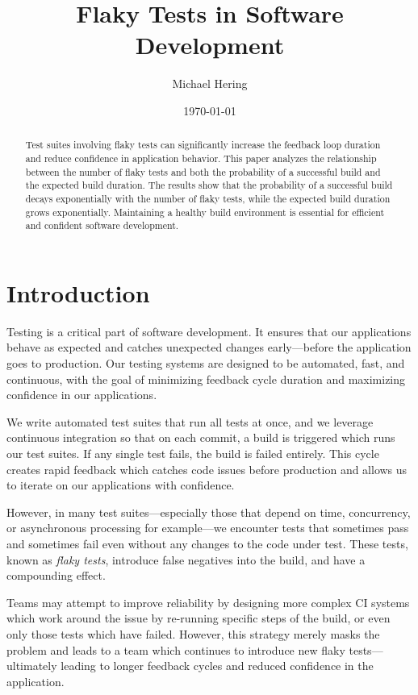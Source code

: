\documentclass[letterpaper]{article}
\title{Flaky Tests in Software Development}
\author{Michael Hering}
\date{\today}
\begin{document}
\maketitle

\begin{abstract}    
    Test suites involving flaky tests can significantly increase the feedback loop duration and reduce confidence in application behavior. This paper analyzes the relationship between the number of flaky tests and both the probability of a successful build and the expected build duration. The results show that the probability of a successful build decays exponentially with the number of flaky tests, while the expected build duration grows exponentially. Maintaining a healthy build environment is essential for efficient and confident software development.
\end{abstract}

\section{Introduction}

Testing is a critical part of software development. It ensures that our applications behave as expected and catches unexpected changes early—before the application goes to production. Our testing systems are designed to be automated, fast, and continuous, with the goal of minimizing feedback cycle duration and maximizing confidence in our applications. 

We write automated test suites that run all tests at once, and we leverage continuous integration so that on each commit, a build is triggered which runs our test suites. If any single test fails, the build is failed entirely. This cycle creates rapid feedback which catches code issues before production and allows us to iterate on our applications with confidence.

However, in many test suites—especially those that depend on time, concurrency, or asynchronous processing for example—we encounter tests that sometimes pass and sometimes fail even without any changes to the code under test. These tests, known as \emph{flaky tests}, introduce false negatives into the build, and have a compounding effect.

Teams may attempt to improve reliability by designing more complex CI systems which work around the issue by re-running specific steps of the build, or even only those tests which have failed. However, this strategy merely masks the problem and leads to a team which continues to introduce new flaky tests—ultimately leading to longer feedback cycles and reduced confidence in the application. 
\end{document}
